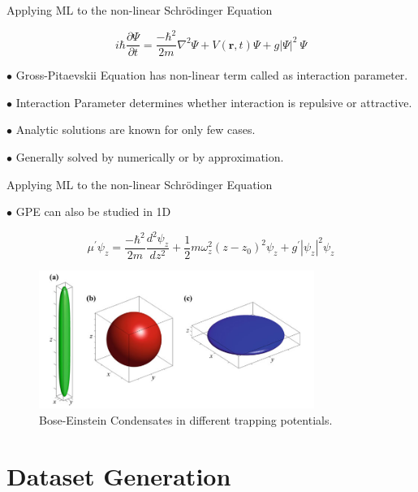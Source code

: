 \documentclass{beamer}
\begin{document}
\begin{frame}{Applying ML to the non-linear Schr{\"o}dinger Equation}

$$i \hbar \frac {\partial \Psi}{\partial t} = \frac {-\hbar^2}{2m}\nabla^2
\Psi + V(\boldsymbol{r}, t)\Psi + g|\Psi|^2\ \Psi$$

\vskip 0.5cm

$\bullet$ Gross-Pitaevskii Equation has non-linear term called as interaction parameter.

\vskip 0.5cm

$\bullet$ Interaction Parameter determines whether interaction is repulsive or attractive.

\vskip 0.5cm

$\bullet$ Analytic solutions are known for only few cases.

\vskip 0.5cm

$\bullet$ Generally solved by numerically or by approximation.


\end{frame}


\begin{frame}{Applying ML to the non-linear Schr{\"o}dinger Equation}

$\bullet$ GPE can also be studied in 1D

$$\mu^{\prime}\psi_z = \frac{-\hbar^2}{2m}\frac{d^2\psi_z}{dz^2} + \frac{1}{2}m\omega_z^2 (z-z_0)^2\psi_z + g^{\prime}|\psi_z|^2\psi_z$$

\begin{figure}[Htb!]
\includegraphics[width=0.8\textwidth]{BoseEinsteinCondensate.png}
\caption{\label{fig:DPandSE} Bose-Einstein Condensates in different trapping potentials.}
\end{figure}

\end{frame}

\section{Dataset Generation}
\end{document}

